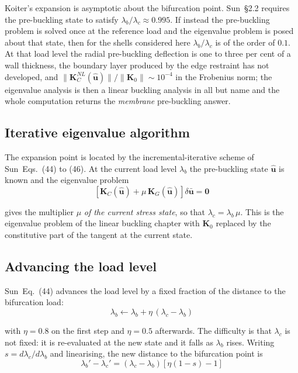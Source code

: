 \documentclass[11pt,a4paper]{article}
\begin{document}
Koiter's expansion is asymptotic about the bifurcation point.  Sun~\S2.2
requires the pre-buckling state to satisfy $\lambda_b/\lambda_c \approx
0.995$.  If instead the pre-buckling problem is solved once at the reference
load and the eigenvalue problem is posed about that state, then for the shells
considered here $\lambda_b/\lambda_c$ is of the order of $0.1$.  At that load
level the radial pre-buckling deflection is one to three per cent of a wall
thickness, the boundary layer produced by the edge restraint has not
developed, and $\lVert\boldsymbol{K}_C^{NL}(\boldsymbol{\hat{u}})\rVert /
\lVert\boldsymbol{K}_0\rVert \sim 10^{-4}$ in the Frobenius norm; the
eigenvalue analysis is
then a linear buckling analysis in all but name and the whole computation
returns the \emph{membrane} pre-buckling answer.

\subsection{Iterative eigenvalue algorithm}

The expansion point is located by the incremental-iterative scheme of
Sun~Eqs.~(44) to (46).  At the current load level $\lambda_b$ the pre-buckling
state $\boldsymbol{\hat{u}}$ is known and the eigenvalue problem
\begin{equation}\label{eq:eigenproblem}
	\left[ \boldsymbol{K}_C(\boldsymbol{\hat{u}})
	+ \mu\,\boldsymbol{K}_G(\boldsymbol{\hat{u}}) \right]
	\delta\boldsymbol{\bar{u}} = \boldsymbol{0}
\end{equation}

\noindent gives the multiplier $\mu$ \emph{of the current stress state}, so
that $\lambda_c = \lambda_b\,\mu$.  This is the eigenvalue problem of the
linear buckling chapter with $\boldsymbol{K}_0$ replaced by the constitutive
part of the tangent at the current state.

\subsection{Advancing the load level}
\label{sec:step}

Sun~Eq.~(44) advances the load level by a fixed fraction of the distance to
the bifurcation load:
\begin{equation}\label{eq:step}
	\lambda_b \leftarrow \lambda_b + \eta\,(\lambda_c - \lambda_b)
\end{equation}

\noindent with $\eta = 0.8$ on the first step and $\eta = 0.5$ afterwards.
The difficulty is that $\lambda_c$ is not fixed: it is re-evaluated at the new
state and it falls as $\lambda_b$ rises.  Writing $s = d\lambda_c/d\lambda_b$
and linearising, the new distance to the bifurcation point is
\begin{equation}\label{eq:step-overshoot}
	\lambda_b' - \lambda_c'
	= (\lambda_c - \lambda_b)\left[ \eta(1-s) - 1 \right]
\end{equation}
\end{document}
